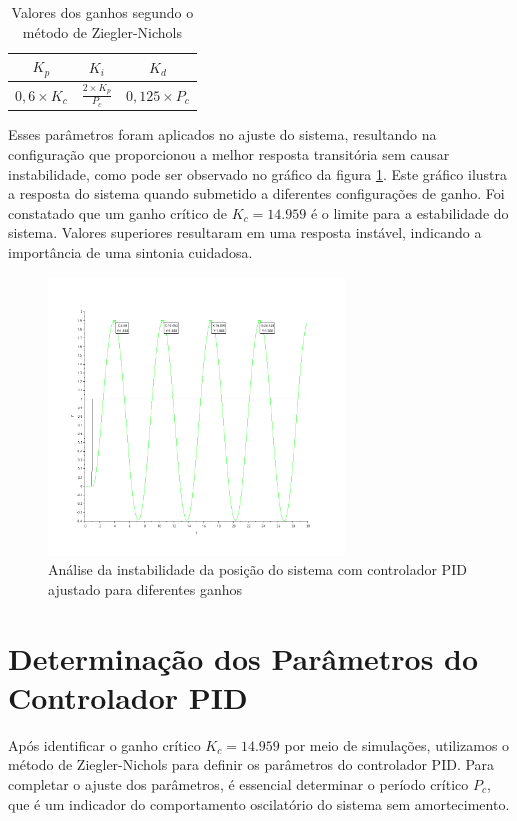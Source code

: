 \begin{table}[h]
\centering
\begin{tabular}{ccc}
\hline
\( K_p \) & \( K_i \) & \( K_d \) \\
\hline
\( 0,6 \times K_c \) & \( \frac{2 \times K_p}{P_c} \) & \( 0,125 \times P_c \) \\
\hline
\end{tabular}
\caption{Valores dos ganhos segundo o método de Ziegler-Nichols}
\label{tab:ziegler-nichols}
\end{table}

Esses parâmetros foram aplicados no ajuste do sistema, resultando na configuração que proporcionou a melhor resposta transitória sem causar instabilidade, como pode ser observado no gráfico da figura \ref{fig:instavel-posicao-sistema-controlador}. Este gráfico ilustra a resposta do sistema quando submetido a diferentes configurações de ganho. Foi constatado que um ganho crítico de \( K_c = 14.959 \) é o limite para a estabilidade do sistema. Valores superiores resultaram em uma resposta instável, indicando a importância de uma sintonia cuidadosa.

\begin{figure}[H]
    \centering
    \includegraphics[width=0.7\textwidth]{6-atividade/assets/instavel-posicao-sistema-controlador.png}
    \caption{Análise da instabilidade da posição do sistema com controlador PID ajustado para diferentes ganhos}
    \label{fig:instavel-posicao-sistema-controlador}
\end{figure}

\section{Determinação dos Parâmetros do Controlador PID}
Após identificar o ganho crítico \( K_c = 14.959 \) por meio de simulações, utilizamos o método de Ziegler-Nichols para definir os parâmetros do controlador PID. Para completar o ajuste dos parâmetros, é essencial determinar o período crítico \( P_c \), que é um indicador do comportamento oscilatório do sistema sem amortecimento.


